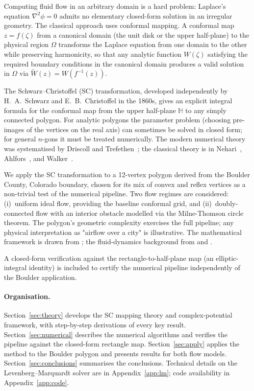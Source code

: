 \documentclass[11pt]{article}
\newcommand{\HH}{\mathbb{H}}
\begin{document}
Computing fluid flow in an arbitrary domain is a hard problem: Laplace's
equation $\nabla^2 \phi = 0$ admits no elementary closed-form solution in an
irregular geometry. The classical approach uses conformal mapping. A conformal
map $z = f(\zeta)$ from a canonical domain (the unit disk or the upper
half-plane) to the physical region $\Omega$ transforms the Laplace equation
from one domain to the other while preserving harmonicity, so that any
analytic function $W(\zeta)$ satisfying the required boundary conditions in
the canonical domain produces a valid solution in $\Omega$ via
$\tilde{W}(z) = W(f^{-1}(z))$.

The Schwarz--Christoffel (SC) transformation, developed independently by
H.~A.~Schwarz and E.~B.~Christoffel in the 1860s, gives an explicit integral
formula for the conformal map from the upper half-plane $\HH$ to any simply
connected polygon. For analytic polygons the parameter problem (choosing
pre-images of the vertices on the real axis) can sometimes be solved in
closed form; for general $n$-gons it must be treated numerically. The modern
numerical theory was systematised by Driscoll and Trefethen~\citep{DT02}; the
classical theory is in Nehari~\citep{Nehari52}, Ahlfors~\citep{Ahlfors79},
and Walker~\citep{Walker64}.

We apply the SC transformation to a 12-vertex polygon derived from the
Boulder County, Colorado boundary, chosen for its mix of convex and reflex
vertices as a non-trivial test of the numerical pipeline. Two flow regimes
are considered: (i)~uniform ideal flow, providing the baseline conformal grid,
and (ii)~doubly-connected flow with an interior obstacle modelled via the
Milne-Thomson circle theorem. The polygon's geometric complexity exercises
the full pipeline; any physical interpretation as "airflow over a city" is
illustrative. The mathematical framework is drawn from
\citet{AF03,DT02,Nehari52}; the fluid-dynamics background from \citet{BO99}
and \citet{MT68}.

A closed-form verification against the rectangle-to-half-plane map (an
elliptic-integral identity) is included to certify the numerical pipeline
independently of the Boulder application.

\paragraph{Organisation.}
Section~\ref{sec:theory} develops the SC mapping theory and complex-potential
framework, with step-by-step derivations of every key result.
Section~\ref{sec:numerical} describes the numerical algorithms and verifies
the pipeline against the closed-form rectangle map. Section~\ref{sec:apply}
applies the method to the Boulder polygon and presents results for both flow
models. Section~\ref{sec:conclusions} summarises the conclusions. Technical
details on the Levenberg--Marquardt solver are in Appendix~\ref{app:lm};
code availability in Appendix~\ref{app:code}.
\end{document}
